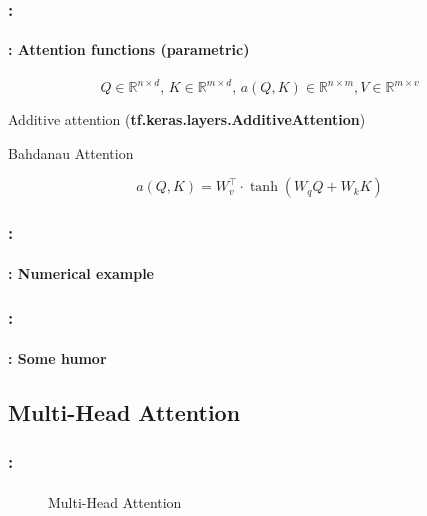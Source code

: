 \documentclass[xcolor=table]{beamer}
\begin{document}
\begin{frame}
	\frametitle{\insertshortsubtitle: \insertsection}
	\framesubtitle{\insertsubsection: Attention functions (parametric)}
	
	\[Q \in \mathbb{R}^{n \times d}, \, K \in \mathbb{R}^{m \times d}, \, a(Q, K) \in \mathbb{R}^{n \times m}, V \in \mathbb{R}^{m \times v} \]
	
	\vspace{12pt}
	
	Additive attention (\textbf{tf.keras.layers.AdditiveAttention})
	
	Bahdanau Attention
	
	\[a(Q, K) = W_v^\top \cdot \tanh(W_q Q + W_k K)\]
	
\end{frame}

\begin{frame}
	\frametitle{\insertshortsubtitle: \insertsection}
	\framesubtitle{\insertsubsection: Numerical example}
	
	\begin{center}
	\end{center}
	
\end{frame}


\begin{frame}
	\frametitle{\insertshortsubtitle: \insertsection}
	\framesubtitle{\insertsubsection: Some humor}
	
	\begin{center}
	\end{center}
	
\end{frame}

\subsection{Multi-Head Attention}

\begin{frame}
	\frametitle{\insertshortsubtitle: \insertsection}
	\framesubtitle{\insertsubsection}

	\begin{figure}
		\centering
		
		\caption{Multi-Head Attention \cite{2017-vaswani-al}}
	\end{figure}
	
\end{frame}
\end{document}
